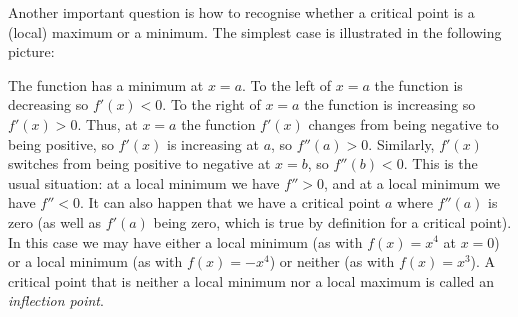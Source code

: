 \documentclass[reqno]{amsart}
\theoremstyle{definition}
\begin{document}
Another important question is how to recognise whether a critical
point is a (local) maximum or a minimum.  The simplest case is
illustrated in the following picture:
\begin{center}
\end{center}
The function has a minimum at $x=a$.  To the left of $x=a$ the
function is decreasing so $f'(x)<0$.  To the right of $x=a$ the
function is increasing so $f'(x)>0$.  Thus, at $x=a$ the function
$f'(x)$ changes from being negative to being positive, so $f'(x)$ is
increasing at $a$, so $f''(a)>0$.  Similarly, $f'(x)$ switches from
being positive to negative at $x=b$, so $f''(b)<0$.  This is the usual
situation: at a local minimum we have $f''>0$, and at a local minimum
we have $f''<0$.  It can also happen that we have a critical point $a$
where $f''(a)$ is zero (as well as $f'(a)$ being zero, which is true
by definition for a critical point).  In this case we may have either
a local minimum (as with $f(x)=x^4$ at $x=0$) or a local minimum (as
with $f(x)=-x^4$) or neither (as with $f(x)=x^3$).  A critical point
that is neither a local minimum nor a local maximum is called an
\emph{inflection point}.
\begin{center}
\end{center}
\end{document}
